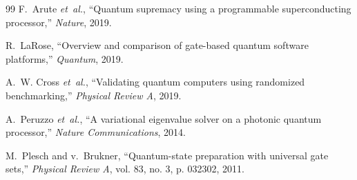 \documentclass[conference]{IEEEtran}
\begin{document}
\begin{thebibliography}{99}
F.~Arute \emph{et~al.}, ``Quantum supremacy using a programmable superconducting processor,'' \emph{Nature}, 2019.

R.~LaRose, ``Overview and comparison of gate-based quantum software platforms,'' \emph{Quantum}, 2019.

A.~W. Cross \emph{et~al.}, ``Validating quantum computers using randomized benchmarking,'' \emph{Physical Review A}, 2019.

A.~Peruzzo \emph{et~al.}, ``A variational eigenvalue solver on a photonic quantum processor,'' \emph{Nature Communications}, 2014.

M.~Plesch and v.~Brukner, ``Quantum-state preparation with universal gate sets,'' \emph{Physical Review A}, vol. 83, no. 3, p. 032302, 2011.

\end{thebibliography}
\end{document}
